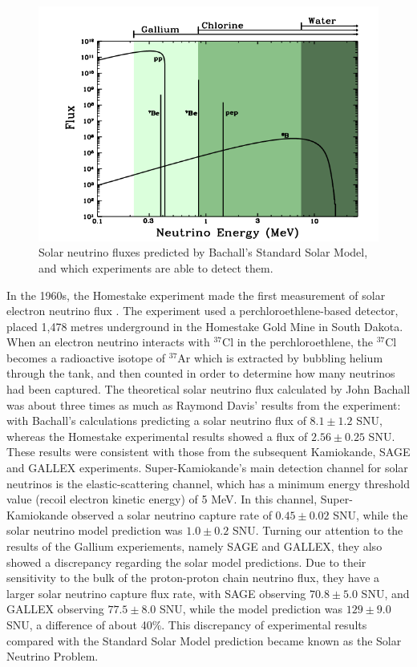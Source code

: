 \begin{figure}
    \includegraphics[width=\textwidth]{Figures/nu_energy_bachall.png}
    \caption{Solar neutrino fluxes predicted by Bachall's Standard Solar Model, and which experiments are able to detect them. \cite{Bahcall_2003}}
    \label{fig:nu_energy_bachall}
\end{figure}

In the 1960s, the Homestake experiment made the first measurement of solar electron neutrino flux \cite{homestake_davis}. The experiment used a perchloroethlene-based detector, placed 1,478 metres underground in the Homestake Gold Mine in South Dakota. When an electron neutrino interacts with ${ }^{37} \mathrm{Cl}$ in the perchloroethlene, the ${ }^{37} \mathrm{Cl}$ becomes a radioactive isotope of ${ }^{37} \mathrm{Ar}$ which is extracted by bubbling helium through the tank, and then counted in order to determine how many neutrinos had been captured. The theoretical solar neutrino flux calculated by John Bachall was about three times as much as Raymond Davis' results from the experiment: with Bachall's calculations predicting a solar neutrino flux of $8.1 \pm 1.2$ SNU, whereas the Homestake experimental results showed a flux of $2.56 \pm 0.25$ SNU. These results were consistent with those from the subsequent Kamiokande, SAGE and GALLEX experiments. Super-Kamiokande's main detection channel for solar neutrinos is the elastic-scattering channel, which has a minimum energy threshold value (recoil electron kinetic energy) of 5 MeV. In this channel, Super-Kamiokande observed a solar neutrino capture rate of $0.45 \pm 0.02$ SNU, while the solar neutrino model prediction was $1.0 \pm 0.2$ SNU. Turning our attention to the results of the Gallium experiements, namely SAGE and GALLEX, they also showed a discrepancy regarding the solar model predictions. Due to their sensitivity to the bulk of the proton-proton chain neutrino flux, they have a larger solar neutrino capture flux rate, with SAGE observing $70.8 \pm 5.0$ SNU, and GALLEX observing $77.5 \pm 8.0$ SNU, while the model prediction was $129 \pm 9.0$ SNU, a difference of about 40\%. This discrepancy of experimental results compared with the Standard Solar Model prediction became known as the Solar Neutrino Problem. 


